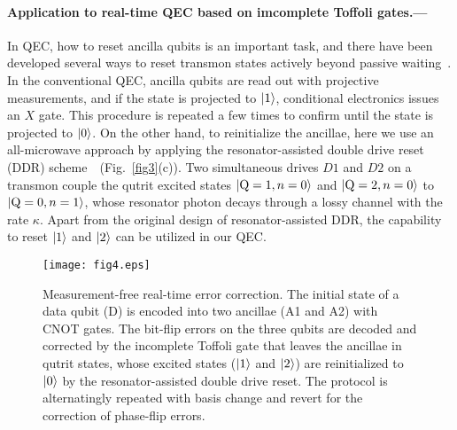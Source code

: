 \documentclass[aps,prl,twocolumn,groupedaddress,superscriptaddress]{revtex4}
\begin{document}
\paragraph{Application to real-time QEC based on imcomplete Toffoli gates.---}
In QEC, how to reset ancilla qubits is an important task, and there have been developed several ways to reset transmon states actively beyond passive waiting~\cite{riste2013,salathe2018,andersen2019,bultink2020,riste2020,corcoles2021}.
In the conventional QEC, ancilla qubits are read out with projective measurements, and if the state is projected to $\ket{1}$, conditional electronics issues an $X$ gate.
This procedure is repeated a few times to confirm until the state is projected to $\ket{0}$.
On the other hand, to reinitialize the ancillae, here we use an all-microwave approach by applying the resonator-assisted double drive reset (DDR) scheme~\cite{magnard2018,geerlings2013}~(Fig.~\ref{fig3}(c)).
Two simultaneous drives $D1$ and $D2$ on a transmon couple the qutrit excited states $\ket{{\rm Q}=1,n=0}$ and $\ket{{\rm Q}=2,n=0}$ to $\ket{{\rm Q}=0,n=1}$, whose resonator photon decays through a lossy channel with the rate $\kappa$.
Apart from the original design of resonator-assisted DDR, the capability to reset $\ket{1}$ and $\ket{2}$ can be utilized in our QEC.

\begin{figure}[t]
\texttt{[image: fig4.eps]}
\caption{
Measurement-free real-time error correction.
The initial state of a data qubit (D) is encoded into two ancillae (A1 and A2) with CNOT gates.
The bit-flip errors on the three qubits are decoded and corrected by the incomplete Toffoli gate that leaves the ancillae in qutrit states, whose excited states ($\ket{1}$ and $\ket{2}$) are reinitialized to $\ket{0}$ by the resonator-assisted double drive reset.
The protocol is alternatingly repeated with basis change and revert for the correction of phase-flip errors.
\label{fig4}}
\end{figure}
\end{document}
